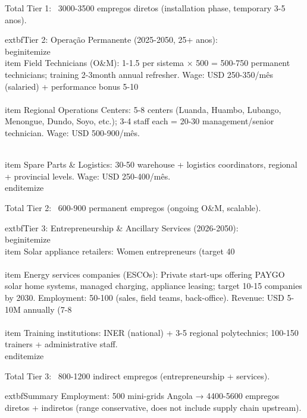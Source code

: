 \documentclass[12pt, a4paper]{article}
\begin{document}
{{{{{{{{{{{{Total Tier 1: ~3000-3500 empregos diretos (installation phase, temporary 3-5 anos).

	extbf{Tier 2: Operação Permanente (2025-2050, 25+ anos):}
\\begin{itemize}
\\item Field Technicians (O&M): 1-1.5 per sistema × 500 = 500-750 permanent technicians; training 2-3month annual refresher. Wage: USD 250-350/mês (salaried) + performance bonus 5-10\\%

\\item Regional Operations Centers: 5-8 centers (Luanda, Huambo, Lubango, Menongue, Dundo, Soyo, etc.); 3-4 staff each = 20-30 management/senior technician. Wage: USD 500-900/mês.

\\item Spare Parts & Logistics: 30-50 warehouse + logistics coordinators, regional + provincial levels. Wage: USD 250-400/mês.
\\end{itemize}

Total Tier 2: ~600-900 permanent empregos (ongoing O&M, scalable).

	extbf{Tier 3: Entrepreneurship & Ancillary Services (2026-2050):}
\\begin{itemize}
\\item Solar appliance retailers: Women entrepreneurs (target 40\\%

\\item Energy services companies (ESCOs): Private start-ups offering PAYGO solar home systems, managed charging, appliance leasing; target 10-15 companies by 2030. Employment: 50-100 (sales, field teams, back-office). Revenue: USD 5-10M annually (7-8\\%

\\item Training institutions: INER (national) + 3-5 regional polytechnics; 100-150 trainers + administrative staff.
\\end{itemize}

Total Tier 3: ~800-1200 indirect empregos (entrepreneurship + services).

	extbf{Summary Employment: 500 mini-grids Angola → 4400-5600 empregos diretos + indiretos (range conservative, does not include supply chain upstream)}.

}}}}}}}}}}}}
\end{document}
